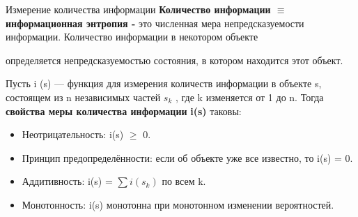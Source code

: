 \begin{frame}{Измерение количества информации}
\noindent\color[rgb]{0,0.5,0.0}\textbf{Количество информации $\equiv$ информационная энтропия  - }
\color{black}
это численная мера
непредсказуемости информации. Количество информации в некотором объекте

\noindent определяется непредсказуемостью состояния, в котором находится этот объект.

\noindent Пусть i (s) — функция для измерения количеств информации в объекте s, состоящем из n
независимых частей $s_k$
, где k изменяется от 1 до n. Тогда 
\color[rgb]{0,0.5,0.0}\textbf{свойства меры количества информации}
\color{black}
\textbf{i(s)} таковы:

\begin{itemize}
	\item[\textbullet] Неотрицательность: i(s) $\geq$ 0.
	\item[\textbullet] Принцип предопределённости: если об объекте уже все известно, то i(s) = 0.
	\item[\textbullet] Аддитивность: i(s) = $\sum i(s_k)$ по всем k.
	\item[\textbullet] Монотонность: i(s) монотонна при монотонном изменении вероятностей.
\end{itemize}

\end{frame}